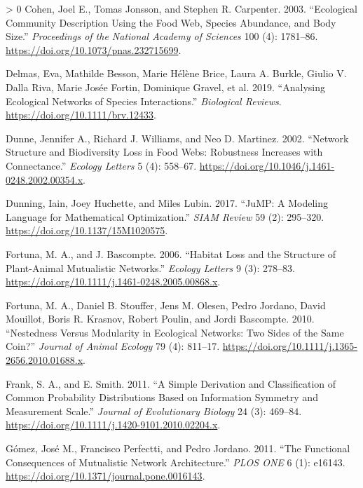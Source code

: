 \documentclass[10pt,oneside]{article}
\newlength{\cslhangindent}
\newenvironment{CSLReferences}[3] %
 {%
  \setlength{\parindent}{0pt}
  \ifodd #1 \everypar{\setlength{\hangindent}{\cslhangindent}}\ignorespaces\fi
  \ifnum #2 > 0
  \setlength{\parskip}{#2\baselineskip}
  \fi
 }%
 {}
\begin{document}
\begin{CSLReferences}{1}{0}
\leavevmode\hypertarget{ref-Cohen2003EcoComa}{}%
Cohen, Joel E., Tomas Jonsson, and Stephen R. Carpenter. 2003.
{``Ecological Community Description Using the Food Web, Species
Abundance, and Body Size.''} \emph{Proceedings of the National Academy
of Sciences} 100 (4): 1781--86.
\url{https://doi.org/10.1073/pnas.232715699}.

\leavevmode\hypertarget{ref-Delmas2019AnaEco}{}%
Delmas, Eva, Mathilde Besson, Marie Hélène Brice, Laura A. Burkle,
Giulio V. Dalla Riva, Marie Josée Fortin, Dominique Gravel, et al. 2019.
{``Analysing Ecological Networks of Species Interactions.''}
\emph{Biological Reviews}. \url{https://doi.org/10.1111/brv.12433}.

\leavevmode\hypertarget{ref-Dunne2002NetStrb}{}%
Dunne, Jennifer A., Richard J. Williams, and Neo D. Martinez. 2002.
{``Network Structure and Biodiversity Loss in Food Webs: Robustness
Increases with Connectance.''} \emph{Ecology Letters} 5 (4): 558--67.
\url{https://doi.org/10.1046/j.1461-0248.2002.00354.x}.

\leavevmode\hypertarget{ref-Dunning2017JumMod}{}%
Dunning, Iain, Joey Huchette, and Miles Lubin. 2017. {``JuMP: A Modeling
Language for Mathematical Optimization.''} \emph{SIAM Review} 59 (2):
295--320. \url{https://doi.org/10.1137/15M1020575}.

\leavevmode\hypertarget{ref-Fortuna2006HabLos}{}%
Fortuna, M. A., and J. Bascompte. 2006. {``Habitat Loss and the
Structure of Plant-Animal Mutualistic Networks.''} \emph{Ecology
Letters} 9 (3): 278--83.
\url{https://doi.org/10.1111/j.1461-0248.2005.00868.x}.

\leavevmode\hypertarget{ref-Fortuna2010NesMod}{}%
Fortuna, M. A., Daniel B. Stouffer, Jens M. Olesen, Pedro Jordano, David
Mouillot, Boris R. Krasnov, Robert Poulin, and Jordi Bascompte. 2010.
{``Nestedness Versus Modularity in Ecological Networks: Two Sides of the
Same Coin?''} \emph{Journal of Animal Ecology} 79 (4): 811--17.
\url{https://doi.org/10.1111/j.1365-2656.2010.01688.x}.

\leavevmode\hypertarget{ref-Frank2011SimDera}{}%
Frank, S. A., and E. Smith. 2011. {``A Simple Derivation and
Classification of Common Probability Distributions Based on Information
Symmetry and Measurement Scale.''} \emph{Journal of Evolutionary
Biology} 24 (3): 469--84.
\url{https://doi.org/10.1111/j.1420-9101.2010.02204.x}.

\leavevmode\hypertarget{ref-Gomez2011FunConb}{}%
Gómez, José M., Francisco Perfectti, and Pedro Jordano. 2011. {``The
Functional Consequences of Mutualistic Network Architecture.''}
\emph{PLOS ONE} 6 (1): e16143.
\url{https://doi.org/10.1371/journal.pone.0016143}.


\end{CSLReferences}
\end{document}
